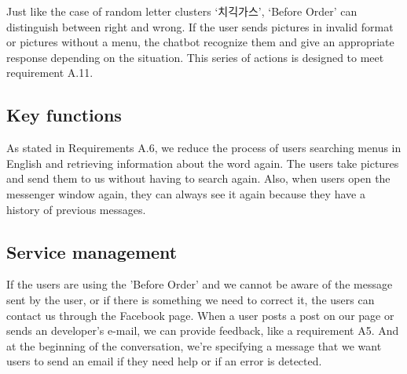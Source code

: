Just like the case of random letter clusters ‘치긱가스’, ‘Before Order’ can distinguish between right and wrong. If the user sends pictures in invalid format or pictures without a menu, the chatbot recognize them and give an appropriate response depending on the situation. This series of actions is designed to meet requirement A.11.


\subsection{Key functions}
As stated in Requirements A.6, we reduce the process of users searching menus in English and retrieving information about the word again. The users take pictures and send them to us without having to search again. Also, when users open the messenger window again, they can always see it again because they have a history of previous messages.

\subsection{Service management}
If the users are using the 'Before Order' and we cannot be aware of the message sent by the user, or if there is something we need to correct it, the users can contact us through the Facebook page. When a user posts a post on our page or sends an developer’s e-mail, we can provide feedback, like a requirement A5. And at the beginning of the conversation, we're specifying a message that we want users to send an email if they need help or if an error is detected.











